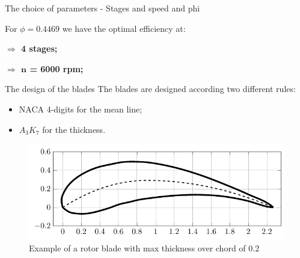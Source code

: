 \documentclass{beamer}
\newcommand{\myspaceneg}[0]{\vspace{-0.15cm}}
\newcommand{\highlightgreenC}[1]{\textcolor{chameleongreen3}{#1}}%
\begin{document}
\begin{frame}[t]{The choice of parameters - Stages and speed and phi}

\myspaceneg
\myspaceneg
\begin{center}
For $\phi = 0.4469$ we have the optimal efficiency at:

\textbf{$\Rightarrow$ \highlightgreenC{4 stages};}

\textbf{$\Rightarrow$ \highlightgreenC{$\mathbf{n}$ = 6000 rpm};}
\end{center}

\vspace{-0.4cm}
\begin{figure}%
    \centering
\end{figure}
\end{frame}





\begin{frame}[t]{The design of the blades}
The blades are designed according two different rules:
\begin{itemize}
	\item NACA 4-digits for the mean line;
	\item $A_3K_7$ for the thickness.
\end{itemize}
\begin{figure}[hbtp]
\centering
\includegraphics[scale=0.85]{fig/rotor_blade.pdf}
\caption{Example of a rotor blade with max thickness over chord of 0.2}
\end{figure}
\end{frame}
\end{document}
